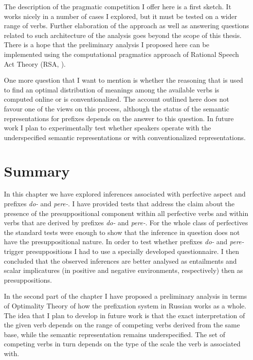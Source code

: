 The description of the pragmatic competition I offer here is a first sketch. It works nicely in a number of cases I explored, but it must be tested on a wider range of verbs. Further elaboration of the approach as well as answering questions related to such architecture of the analysis goes beyond the scope of this thesis. There is a hope that the preliminary analysis I proposed here can be implemented using the computational pragmatics approach of Rational Speech Act Theory (RSA, \citealt{Franke:09, FrankGoodman:12, GoodmanStuhlmuller:13, FrankeJager:15, GoodmanFrank:16}). 

One more question that I want to mention is whether the reasoning that is used to find an optimal distribution of meanings among the available verbs is computed online or is conventionalized. The account outlined here does not favour one of the views on this process, although the status of the semantic representations for prefixes depends on the answer to this question. In future work I plan to experimentally test whether speakers operate with the underspecified semantic representations or with conventionalized representations. 
\section{Summary}
In this chapter we have explored inferences associated with perfective aspect and prefixes \textit{do-} and \textit{pere-}. I have provided tests that address the claim about the presence of the presuppositional component within all perfective verbs and within verbs that are derived by prefixes \textit{do-} and \textit{pere-}. For the whole class of perfectives the standard tests were enough to show that the inference in question does not have the presuppositional nature. In order to test whether prefixes \textit{do-} and \textit{pere-} trigger presuppositions I had to use a specially developed questionnaire. I then concluded that the observed inferences are better analysed as entailments and scalar implicatures (in positive and negative environments, respectively) then as presuppositions.

In the second part of the chapter I have proposed a preliminary analysis in terms of Optimality Theory of how the prefixation system in Russian works as a whole. The idea that I plan to develop in future work is that the exact interpretation of the given verb depends on the range of competing verbs derived from the same base, while the semantic representation remains underspecified. The set of competing verbs in turn depends on the type of the scale the verb is associated with.

